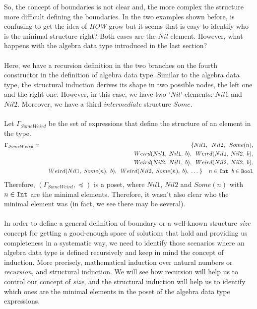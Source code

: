 So, the concept of boundaries is not clear and, the more complex the structure more difficult defining the boundaries. In the two examples shown before, is confusing to get the idea of \textit{HOW} grow but it seems that is easy to identify who is the minimal structure right? Both cases are the $Nil$ element. However, what happens with the  algebra data type introduced in the last section?\\\\
Here, we have a recursion definition in the two branches on the fourth constructor in the definition of  algebra data type. Similar to the  algebra data type, the structural induction derives its shape in two possible nodes, the left one and the right one. However, in this case, we have two '$Nil$' elements: $Nil1$ and $Nil2$. Moreover, we have a third \textit{intermediate} structure $Some$.\\\\
Let $\Gamma_{SomeWeird}$ be the set of expressions that define the structure of an element in the  type.
\begin{eqnarray*}
	\Gamma_{SomeWeird} & = & \{ Nil1, \;\; Nil2, \;\; Some(n), \\
	&& \;\; Weird(Nil1, \; Nil1, \; b), \;\; Weird(Nil1, \; Nil2, \; b), \\
	&& \;\; Weird(Nil2, \; Nil1, \; b), \;\; Weird(Nil2, \; Nil2, \; b),  \\
	&& \;\; Weird(Nil1, \; Some(n), \; b), \;\; Weird(Nil2, \; Some(n), \; b), \; \ldots \; \} \;\; \;\; n \in \texttt{Int} \;\; b \in \texttt{Bool}
\end{eqnarray*}
Therefore, $(\Gamma_{SomeWeird}, \preceq)$ is a poset, where $Nil1$, $Nil2$ and $Some(n)$ with $n \in \texttt{Int}$ are the minimal elements. Therefore, it wasn't also clear who the minimal element was (in fact, we see there may be several).\\\\
In order to define a general definition of boundary or a well-known structure \textit{size} concept for getting a good-enough space of solutions that hold and providing us completeness in a systematic way, we need to identify those scenarios where an algebra data type is defined recursively and keep in mind the concept of induction. More precisely, mathematical induction over natural numbers or \textit{recursion}, and structural induction. We will see how recursion will help us to control our concept of \textit{size}, and the structural induction will help us to identify which ones are the minimal elements in the poset of the algebra data type expressions.\\\\
